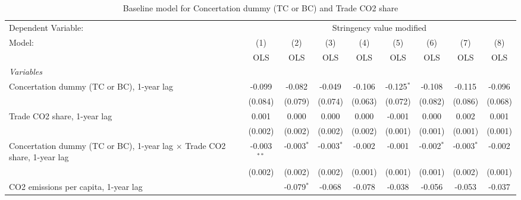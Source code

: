 
\begin{table}[htbp]
   \caption{Baseline model for Concertation dummy (TC or BC) and Trade CO2 share}
   \centering
   \begin{tabular}{lcccccccc}
      \toprule
      Dependent Variable: & \multicolumn{8}{c}{Stringency value modified}\\
      Model:                                                                          & (1)           & (2)          & (3)          & (4)          & (5)           & (6)           & (7)           & (8)\\  
                                                                                      &  OLS          & OLS          & OLS          & OLS          & OLS           & OLS           & OLS           & OLS\\  
      \midrule
      \emph{Variables}\\
      Concertation dummy (TC or BC), 1-year lag                                       & -0.099        & -0.082       & -0.049       & -0.106       & -0.125$^{*}$  & -0.108        & -0.115        & -0.096\\   
                                                                                      & (0.084)       & (0.079)      & (0.074)      & (0.063)      & (0.072)       & (0.082)       & (0.086)       & (0.068)\\   
      Trade CO2 share, 1-year lag                                                     & 0.001         & 0.000        & 0.000        & 0.000        & -0.001        & 0.000         & 0.002         & 0.001\\   
                                                                                      & (0.002)       & (0.002)      & (0.002)      & (0.002)      & (0.001)       & (0.001)       & (0.001)       & (0.001)\\   
      Concertation dummy (TC or BC), 1-year lag $\times$ Trade CO2 share, 1-year lag  & -0.003$^{**}$ & -0.003$^{*}$ & -0.003$^{*}$ & -0.002       & -0.001        & -0.002$^{*}$  & -0.003$^{*}$  & -0.002\\   
                                                                                      & (0.002)       & (0.002)      & (0.002)      & (0.001)      & (0.001)       & (0.001)       & (0.002)       & (0.001)\\   
      CO2 emissions per capita, 1-year lag                                            &               & -0.079$^{*}$ & -0.068       & -0.078       & -0.038        & -0.056        & -0.053        & -0.037\\   

\end{tabular}
\end{table}
